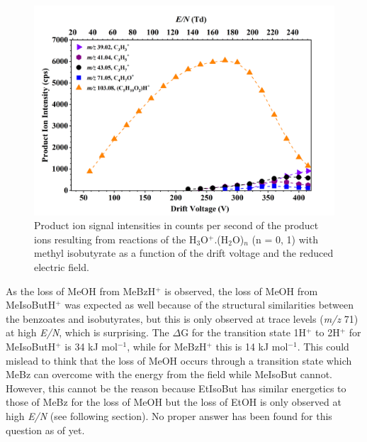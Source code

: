 \begin{figure}[htbp]
\centering
\includegraphics[width=0.8\linewidth]{pics/cocaine-chapter/MeIsobyturate-cps.png}
\caption{Product ion signal intensities in counts per second of the product ions resulting from reactions of the H$_3$O$^+$.(H$_2$O)$_n$ (n = 0, 1) with methyl isobutyrate as a function of the drift voltage and the reduced electric field.} 
\label{fig:MeIsoEN}
\end{figure}




As the loss of MeOH from MeBzH$^+$ is observed, the loss of MeOH from MeIsoButH$^+$ was expected as well because of the structural similarities between the benzoates and isobutyrates, 
but this is only observed at trace levels (\textit{m/z} 71) at high \textit{E/N}, which is surprising.
%
The $\Delta$G for the transition state 1H$^+$ to 2H$^+$ for MeIsoButH$^+$ is 34 kJ mol$^{-1}$, while for MeBzH$^+$ this is 14 kJ mol$^{-1}$.
%
This could  mislead to think that the loss of MeOH occurs through a transition state which MeBz can overcome with the energy from the field while MeIsoBut cannot.
%
However, this cannot be the reason because EtIsoBut has similar energetics to those of MeBz for the loss of MeOH but the loss of EtOH is only observed at high \textit{E/N} (see following section).
%
No proper answer has been found for this question as of yet.


%
%
%

